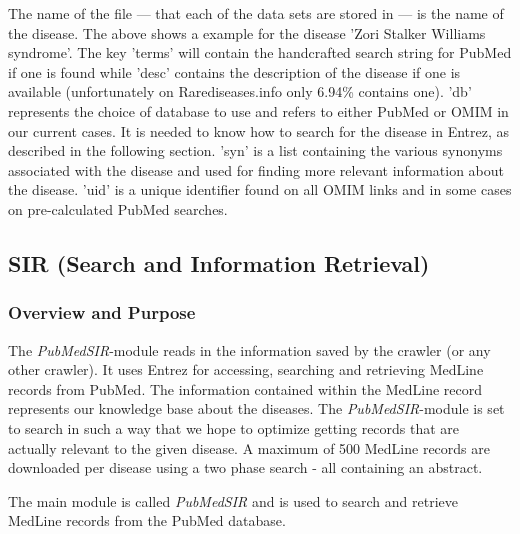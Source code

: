 The name of the file --- that each of the data sets are stored in ---
is the name of the disease. The above shows a example for the disease
'Zori Stalker Williams syndrome'. The key 'terms' will contain the
handcrafted search string for PubMed if one is found while 'desc'
contains the description of the disease if one is available
(unfortunately on Rarediseases.info only 6.94\% contains one). 'db'
represents the choice of database to use and refers to either PubMed
or OMIM in our current cases. It is needed to know how to search for
the disease in Entrez, as described in the following section. 'syn' is
a list containing the various synonyms associated with the disease and
used for finding more relevant information about the disease. 'uid' is
a unique identifier found on all OMIM links and in some cases on
pre-calculated PubMed searches.

\subsection{SIR (Search and Information Retrieval)\label{SIR}}

\subsubsection{Overview and Purpose}
The \textit{PubMedSIR}-module reads in the information saved by the crawler (or any
other crawler). It uses Entrez for accessing, searching and retrieving
MedLine records from PubMed. The information contained within the
MedLine record represents our knowledge base about the diseases. The
\textit{PubMedSIR}-module is set to search in such a way that we hope to optimize
getting records that are actually relevant to the given disease. A
maximum of 500 MedLine records are downloaded per disease using a two
phase search - all containing an abstract.

The main module is called \textit{PubMedSIR} and is used to search and
retrieve MedLine records from the PubMed database.

